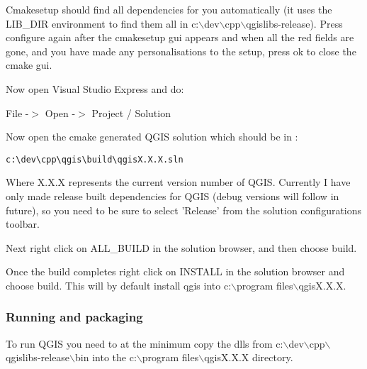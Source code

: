 Cmakesetup should find all dependencies for you automatically (it uses the 
LIB\_DIR environment to find them all in c:$\backslash$dev$\backslash$cpp$\backslash$qgislibs-release). 
Press configure again after the cmakesetup gui appears and when all the red 
fields are gone, and you have made any personalisations to the setup, press 
ok to close the cmake gui.

Now open Visual Studio Express and do:

File -$>$ Open -$>$ Project / Solution

Now open the cmake generated QGIS solution which should be in :

\begin{verbatim}
c:\dev\cpp\qgis\build\qgisX.X.X.sln
\end{verbatim}

Where X.X.X represents the current version number of QGIS. Currently I 
have only made release built dependencies for QGIS (debug versions will follow 
in future), so you need to be sure to select 'Release' from the solution 
configurations toolbar.

Next right click on ALL\_BUILD in the solution browser, and then choose build.

Once the build completes right click on INSTALL in the solution browser and 
choose build. This will by default install qgis into c:$\backslash$program files$\backslash$qgisX.X.X.

\subsubsection{Running and packaging}
To run QGIS you need to at the minimum copy the dlls from c:$\backslash$dev$\backslash$cpp$\backslash$qgislibs-release$\backslash$bin 
into the c:$\backslash$program files$\backslash$qgisX.X.X directory.



